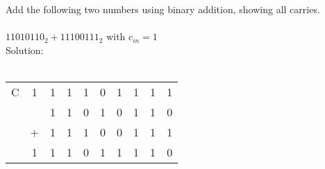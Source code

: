 Add the following two numbers using binary addition, showing all carries. \\
\\
$11010110_2 + 11100111_2$ with $c_{in} = 1$\\

Solution: \\
\\
\begin{tabular}{cccccccccc}
  C & 1 & 1 & 1 & 1 & 0 & 1 & 1 & 1 & 1 \\
    &   & 1 & 1 & 0 & 1 & 0 & 1 & 1 & 0 \\
    & + & 1 & 1 & 1 & 0 & 0 & 1 & 1 & 1 \\
  \hline
    & 1 & 1 & 1 & 0 & 1 & 1 & 1 & 1 & 0 \\
\end{tabular} \\
